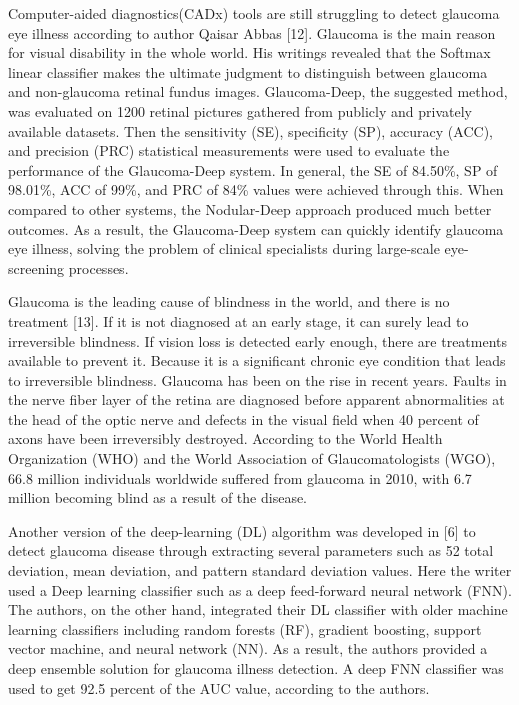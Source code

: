 \vspace{5mm}
Computer-aided diagnostics(CADx) tools are still struggling to detect glaucoma eye illness according to author Qaisar Abbas [12]. Glaucoma is the main reason for visual disability in the whole world. His writings revealed that the Softmax linear classifier makes the ultimate judgment to distinguish between glaucoma and non-glaucoma retinal fundus images. Glaucoma-Deep, the suggested method, was evaluated on 1200 retinal pictures gathered from publicly and privately available datasets. Then the sensitivity (SE), specificity (SP), accuracy (ACC), and precision (PRC) statistical measurements were used to evaluate the performance of the Glaucoma-Deep system. In general, the SE of 84.50\%, SP of 98.01\%, ACC of 99\%, and PRC of 84\% values were achieved through this. When compared to other systems, the Nodular-Deep approach produced much better outcomes. As a result, the Glaucoma-Deep system can quickly identify glaucoma eye illness, solving the problem of clinical specialists during large-scale eye-screening processes.

\vspace{5mm}
Glaucoma is the leading cause of blindness in the world, and there is no treatment [13]. If it is not diagnosed at an early stage, it can surely lead to irreversible blindness. If vision loss is detected early enough, there are treatments available to prevent it. Because it is a significant chronic eye condition that leads to irreversible blindness. Glaucoma has been on the rise in recent years. Faults in the nerve fiber layer of the retina are diagnosed before apparent abnormalities at the head of the optic nerve and defects in the visual field when 40 percent of axons have been irreversibly destroyed. According to the World Health Organization (WHO) and the World Association of Glaucomatologists (WGO), 66.8 million individuals worldwide suffered from glaucoma in 2010, with 6.7 million becoming blind as a result of the disease.

\vspace{5mm}
Another version of the deep-learning (DL) algorithm was developed in [6] to detect glaucoma disease through extracting several parameters such as 52 total deviation, mean deviation, and pattern standard deviation values. Here the writer used a Deep learning classifier such as a deep feed-forward neural network (FNN). The authors, on the other hand, integrated their DL classifier with older machine learning classifiers including random forests (RF), gradient boosting, support vector machine, and neural network (NN). As a result, the authors provided a deep ensemble solution for glaucoma illness detection. A deep FNN classifier was used to get 92.5 percent of the AUC value, according to the authors.

